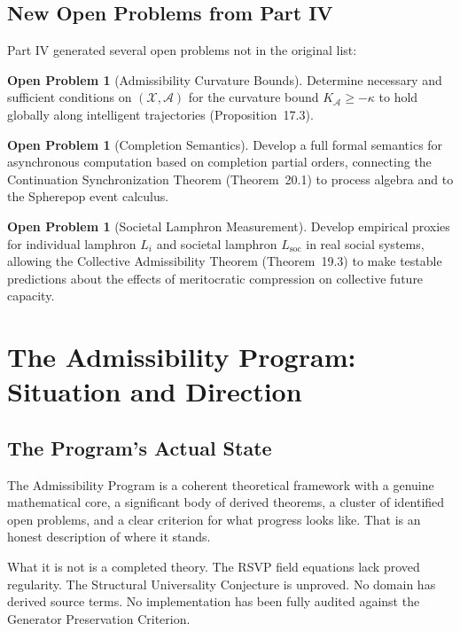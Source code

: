 \documentclass[12pt, oneside]{book}
\theoremstyle{flyxion}
\theoremstyle{definition}
\newtheorem{openproblem}[theorem]{Open Problem}
\begin{document}
\section{New Open Problems from Part IV}

Part IV generated several open problems not in the
original list:

\begin{openproblem}[Admissibility Curvature Bounds]
Determine necessary and sufficient conditions on
$(\mathcal{X}, \mathcal{A})$ for the curvature bound
$K_\mathcal{A} \geq -\kappa$ to hold globally along
intelligent trajectories (Proposition~17.3).
\end{openproblem}

\begin{openproblem}[Completion Semantics]
Develop a full formal semantics for asynchronous
computation based on completion partial orders,
connecting the Continuation Synchronization Theorem
(Theorem~20.1) to process algebra and to the
Spherepop event calculus.
\end{openproblem}

\begin{openproblem}[Societal Lamphron Measurement]
Develop empirical proxies for individual lamphron
$L_i$ and societal lamphron $L_\mathrm{soc}$ in
real social systems, allowing the Collective
Admissibility Theorem (Theorem~19.3) to make
testable predictions about the effects of meritocratic
compression on collective future capacity.
\end{openproblem}

\chapter{The Admissibility Program: Situation and
Direction}

\section{The Program's Actual State}

The Admissibility Program is a coherent theoretical
framework with a genuine mathematical core, a
significant body of derived theorems, a cluster of
identified open problems, and a clear criterion for
what progress looks like. That is an honest description
of where it stands.

What it is not is a completed theory. The RSVP field
equations lack proved regularity. The Structural
Universality Conjecture is unproved. No domain has
derived source terms. No implementation has been fully
audited against the Generator Preservation Criterion.
\end{document}

